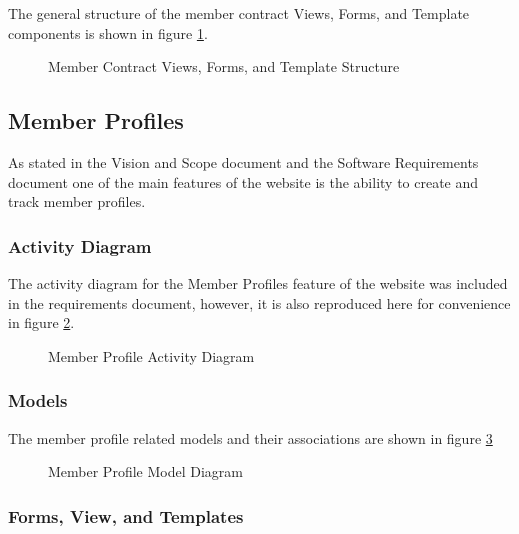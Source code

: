 \documentclass{article}
\begin{document}
The general structure of the member contract Views, Forms, and Template components is shown in figure \ref{fig:memberContractViewFormTemplateDiagram}.

\FloatBarrier
\begin{figure}[h!]
\centering
{}
\caption{Member Contract Views, Forms, and Template Structure}
\label{fig:memberContractViewFormTemplateDiagram}
\end{figure}
\FloatBarrier

\subsection{Member Profiles}

As stated in the Vision and Scope document and the Software Requirements document one of the main features of the website is the ability to create and track member profiles.

\subsubsection{Activity Diagram}
The activity diagram for the Member Profiles feature of the website was included in the requirements document, however, it is also reproduced here for convenience in figure \ref{fig:memberProfileActivityDiagram}.

\FloatBarrier
\begin{figure}[h!]
\centering
{}
\caption{Member Profile Activity Diagram}
\label{fig:memberProfileActivityDiagram}
\end{figure}
\FloatBarrier

\subsubsection{Models}

The member profile related models and their associations are shown in figure \ref{fig:memberProfileModelDiagram}

\FloatBarrier
\begin{figure}[h!]
\centering
{}
\caption{Member Profile Model Diagram}
\label{fig:memberProfileModelDiagram}
\end{figure}
\FloatBarrier

\subsubsection{Forms, View, and Templates}
\end{document}
